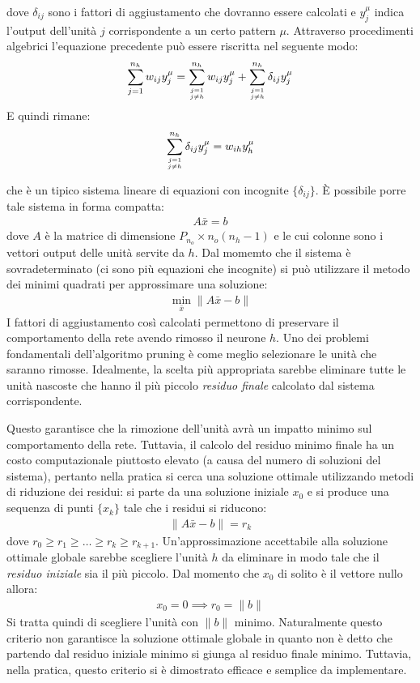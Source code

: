 dove $\delta_{ij}$ sono i fattori di aggiustamento che dovranno essere calcolati e $y_j^\mu$ indica l'output dell'unità $j$ corrispondente a un certo pattern $\mu$.
Attraverso procedimenti algebrici l'equazione precedente può essere riscritta nel seguente modo:
\begin{align*}
	\sum_{j = 1}^{n_h}  w_{ij} y^\mu_j = 
	\sum_{j = 1 \atop j \neq h} ^ {n_h} w_{ij} y^\mu_j + 
	\sum_{j = 1 \atop j \neq h} ^ {n_h} \delta_{ij} y^\mu_j
\end{align*}
E quindi rimane:
\begin{align*}
	\sum_{j = 1 \atop j \neq h} ^ {n_h} \delta_{ij} y^\mu_j =
	w_{ih} y^\mu_h
\end{align*}

che è un tipico sistema lineare di equazioni con incognite $\{\delta_{ij}\}$. È possibile porre tale sistema in forma compatta:
\begin{align*}
	A \bar{x} = b
\end{align*}
dove $A$ è la matrice di dimensione $P_{n_o} \times n_o (n_h - 1)$ e le cui colonne sono i vettori output delle unità servite da $h$. Dal momemto che il sistema è sovradeterminato (ci sono più equazioni che incognite) si può utilizzare il metodo dei minimi quadrati per approssimare una soluzione:
\begin{align}
	\min_{\bar{x}} \|A \bar{x} - b\|
\end{align}
I fattori di aggiustamento così calcolati permettono di preservare il comportamento della rete avendo rimosso il neurone $h$. Uno dei problemi fondamentali dell'algoritmo pruning è come meglio selezionare le unità che saranno rimosse. Idealmente, la scelta più appropriata sarebbe eliminare tutte le unità nascoste che hanno il più piccolo \emph{residuo finale} calcolato dal sistema corrispondente.

\newpage

Questo garantisce che la rimozione dell'unità avrà un impatto minimo sul comportamento della rete. Tuttavia, il calcolo del residuo minimo finale ha un costo computazionale piuttosto elevato (a causa del numero di soluzioni del sistema), pertanto nella pratica si cerca una soluzione ottimale utilizzando metodi di riduzione dei residui: si parte da una soluzione iniziale $x_0$ e si produce una sequenza di punti $\{ x_k \}$ tale che i residui si riducono: 
\begin{align*}
	\|A \bar{x} - b\| = r_k
\end{align*}
dove $r_0 \geq r_1 \geq \dots \geq r_k \geq r_{k + 1}$. Un'approssimazione accettabile alla soluzione ottimale globale sarebbe scegliere l'unità $h$ da eliminare in modo tale che il \emph{residuo iniziale} sia il più piccolo. Dal momento che $x_0$ di solito è il vettore nullo allora:
\begin{align*}
	x_0 = 0 \implies r_0 = \| b \|
\end{align*}
Si tratta quindi di scegliere l'unità con $\| b \|$ minimo. Naturalmente questo criterio non garantisce la soluzione ottimale globale in quanto non è detto che partendo dal residuo iniziale minimo si giunga al residuo finale minimo. Tuttavia, nella pratica, questo criterio si è dimostrato efficace e semplice da implementare.\\

